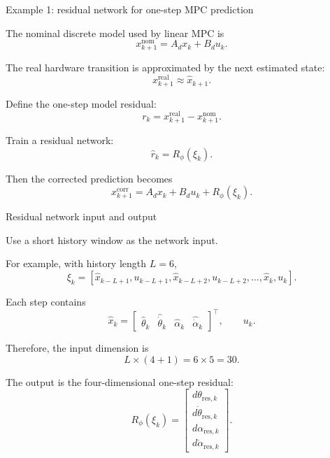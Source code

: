 \documentclass[aspectratio=169]{beamer}
\begin{document}
\begin{frame}{Example 1: residual network for one-step MPC prediction}

The nominal discrete model used by linear MPC is
\[
x_{k+1}^{\mathrm{nom}}
=
A_d x_k+B_d u_k .
\]

\vspace{0.15cm}

The real hardware transition is approximated by the next estimated state:
\[
x_{k+1}^{\mathrm{real}}
\approx
\hat{x}_{k+1}.
\]

\vspace{0.15cm}

Define the one-step model residual:
\[
r_k
=
x_{k+1}^{\mathrm{real}}
-
x_{k+1}^{\mathrm{nom}} .
\]

\vspace{0.15cm}

Train a residual network:
\[
\hat r_k
=
R_\phi(\xi_k).
\]

Then the corrected prediction becomes
\[
x_{k+1}^{\mathrm{corr}}
=
A_d x_k+B_d u_k+R_\phi(\xi_k).
\]

\vspace{0.12cm}



\end{frame}


\begin{frame}{Residual network input and output}

Use a short history window as the network input.



For example, with history length \(L=6\),
\[
\xi_k=
\left[
\hat{x}_{k-L+1},u_{k-L+1},
\hat{x}_{k-L+2},u_{k-L+2},
\ldots,
\hat{x}_{k},u_k
\right].
\]



Each step contains
\[
\hat{x}_k=
\begin{bmatrix}
\hat\theta_k&
\hat{\dot\theta}_k&
\hat\alpha_k&
\hat{\dot\alpha}_k
\end{bmatrix}^{\top},
\qquad
u_k .
\]



Therefore, the input dimension is
\[
L\times(4+1)=6\times5=30.
\]



The output is the four-dimensional one-step residual:
\[
R_\phi(\xi_k)
=
\begin{bmatrix}
d\theta_{\mathrm{res},k}\\
d\dot{\theta}_{\mathrm{res},k}\\
d\alpha_{\mathrm{res},k}\\
d\dot{\alpha}_{\mathrm{res},k}
\end{bmatrix}.
\]

\end{frame}
\end{document}
